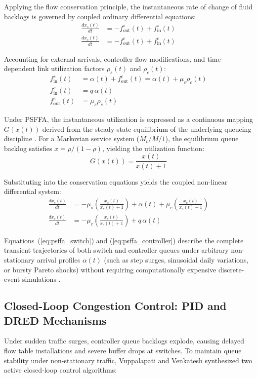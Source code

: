 Applying the flow conservation principle, the instantaneous rate of change of fluid backlogs is governed by coupled ordinary differential equations:
\begin{align}
    \frac{dx_s(t)}{dt} &= -f_{\text{out}}^s(t) + f_{\text{in}}^s(t) \\
    \frac{dx_c(t)}{dt} &= -f_{\text{out}}^c(t) + f_{\text{in}}^c(t)
\end{align}

Accounting for external arrivals, controller flow modifications, and time-dependent link utilization factors $\rho_s(t)$ and $\rho_c(t)$:
\begin{align}
    f_{\text{in}}^s(t) &= \alpha(t) + f_{\text{out}}^c(t) = \alpha(t) + \mu_c \rho_c(t) \\
    f_{\text{in}}^c(t) &= q \, \alpha(t) \\
    f_{\text{out}}^s(t) &= \mu_s \rho_s(t)
\end{align}

Under PSFFA, the instantaneous utilization is expressed as a continuous mapping $G(x(t))$ derived from the steady-state equilibrium of the underlying queueing discipline \cite{vuppalapati2021modeling}. For a Markovian service system ($M_t/M/1$), the equilibrium queue backlog satisfies $x = \rho / (1 - \rho)$, yielding the utilization function:
\begin{equation}
    G(x(t)) = \frac{x(t)}{x(t) + 1}
\end{equation}

Substituting into the conservation equations yields the coupled non-linear differential system:
\begin{align}
    \frac{dx_s(t)}{dt} &= -\mu_s \left( \frac{x_s(t)}{x_s(t) + 1} \right) + \alpha(t) + \mu_c \left( \frac{x_c(t)}{x_c(t) + 1} \right) \label{eq:psffa_switch} \\
    \frac{dx_c(t)}{dt} &= -\mu_c \left( \frac{x_c(t)}{x_c(t) + 1} \right) + q \, \alpha(t) \label{eq:psffa_controller}
\end{align}

Equations~(\ref{eq:psffa_switch}) and (\ref{eq:psffa_controller}) describe the complete transient trajectories of both switch and controller queues under arbitrary non-stationary arrival profiles $\alpha(t)$ (such as step surges, sinusoidal daily variations, or bursty Pareto shocks) without requiring computationally expensive discrete-event simulations \cite{vuppalapati2021modeling}.

\subsection{Closed-Loop Congestion Control: PID and DRED Mechanisms}
Under sudden traffic surges, controller queue backlogs explode, causing delayed flow table installations and severe buffer drops at switches. To maintain queue stability under non-stationary traffic, Vuppalapati and Venkatesh \cite{vuppalapati2021modeling} synthesized two active closed-loop control algorithms:

